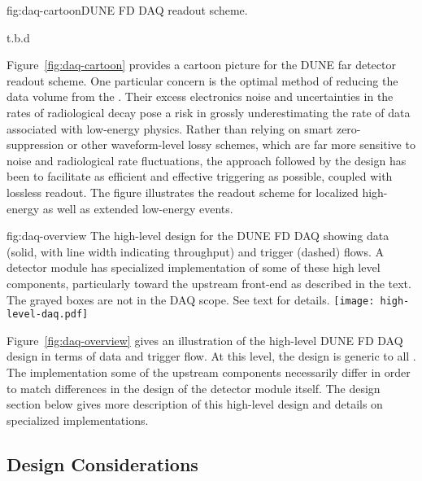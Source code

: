 \begin{dunefigure}{fig:daq-cartoon}{DUNE FD DAQ readout scheme.}
  \begin{center}
    t.b.d
  \end{center}
\end{dunefigure}

Figure~\ref{fig:daq-cartoon} provides a cartoon picture for the DUNE
far detector readout scheme.
One particular concern is the optimal method of reducing the data
volume from the .
Their excess electronics noise and uncertainties in the rates of
radiological decay pose a risk in grossly underestimating the rate of
data associated with low-energy physics.
Rather than relying on smart zero-suppression or other waveform-level
lossy schemes, which are far more sensitive to noise and radiological
rate fluctuations, the approach followed by the  design has
been to facilitate as efficient and effective triggering as possible,
coupled with lossless readout.
The figure illustrates the readout scheme for localized high-energy as
well as extended low-energy events.


\begin{dunefigure}{fig:daq-overview}
  {The high-level design for the DUNE FD DAQ showing data (solid, with
    line width indicating throughput) and trigger (dashed) flows. 
    A detector module has specialized implementation of some of these
    high level components, particularly toward the upstream front-end
    as described in the text. 
    The grayed boxes are not in the DAQ scope.
    See text for details.
}
\texttt{[image: high-level-daq.pdf]}%
\end{dunefigure}


Figure~\ref{fig:daq-overview} gives an illustration of the high-level
DUNE FD DAQ design in terms of data and trigger flow.
At this level, the design is generic to all .  
The implementation some of the upstream components necessarily differ
in order to match differences in the design of the detector module
itself. 
The design section below gives more description of this high-level
design and details on specialized implementations.




\subsection{Design Considerations}
\label{sec:fd-daq-des-consid}

